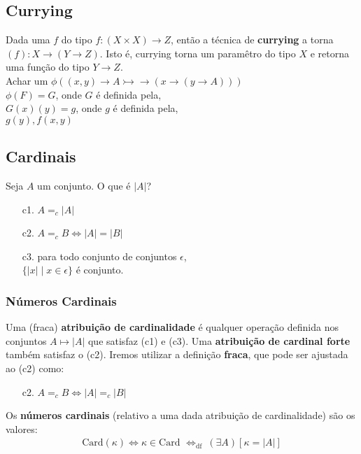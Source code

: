 \documentclass[12pt, a4paper]{article}
\begin{document}
\subsection{Currying}
Dada uma $f$ do tipo $f:(X \times X) \rightarrow Z$, então a técnica de \textbf{currying} a torna $(f): X \rightarrow (Y \rightarrow Z)$.
Isto é, currying torna um paramêtro do tipo $X$ e retorna uma função do tipo $Y \rightarrow Z$.\\


\noindent Achar um $\phi ( (x,y) \rightarrow A \rightarrowtail\!\!\!\!\!\rightarrow (x \rightarrow (y \rightarrow A)))$\\
$\phi(F) = G$, onde $G$ é definida pela,\\
$G(x)(y) = g$, onde $g$ é definida pela,\\
$g(y), f(x,y)$

\subsection{Cardinais}
Seja $A$ um conjunto. O que é $|A|$?
\begin{itemize}
\item[c1.] $A =_c |A|$
\item[c2.] $A =_c B \iff |A| = |B|$
\item[c3.] para todo conjunto de conjuntos $\epsilon$,\\
$\{|x| \mid x \in \epsilon \}$ é conjunto.
\end{itemize}

\subsubsection{Números Cardinais}
Uma (fraca) \textbf{atribuição de cardinalidade} é qualquer operação definida nos conjuntos $A \mapsto |A|$ que satisfaz (c1) e (c3). Uma \textbf{atribuição de cardinal forte} também satisfaz o (c2). Iremos utilizar a definição \textbf{fraca}, que pode ser ajustada ao (c2) como:\\
\begin{itemize}
\item[c2.] $A =_c B \iff |A| =_c |B|$
\end{itemize}

Os \textbf{números cardinais} (relativo a uma dada atribuição de cardinalidade) são os valores:
\begin{align*}
\text{Card}(\kappa) \iff \kappa \in \text{Card } \iff_\text{df } (\exists A)[\kappa = |A|]
\end{align*}
\end{document}
